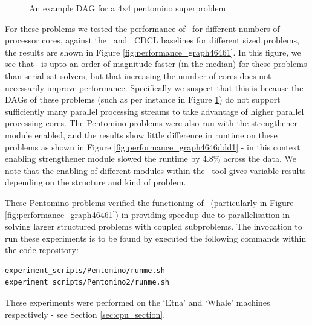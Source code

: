 \documentclass[
10pt, %
a4paper, %
oneside, %
headinclude,footinclude, %
BCOR5mm, %
]{scrartcl}
\begin{document}
\begin{figure}[h]
\caption{An example DAG for a 4x4 pentomino superproblem}\label{fig:dag_example1215}
\end{figure}

For these problems we tested the performance of \dagster\ for different numbers of processor cores, against the \tinisat\ and \lingeling\ CDCL baselines for different sized problems, the results are shown in Figure \ref{fig:performance_graph46461}.
In this figure, we see that \dagster\ is upto an order of magnitude faster (in the median) for these problems than serial sat solvers, but that increasing the number of cores does not necessarily improve performance.
Specifically we suspect that this is because the DAGs of these problems (such as per instance in Figure \ref{fig:dag_example1215}) do not support sufficiently many parallel processing streams to take advantage of higher parallel processing cores.
The Pentomino problems were also run with the strengthener module enabled, and the results show little difference in runtime on these problems as shown in Figure \ref{fig:performance_graph4646ddd1} - in this context enabling strengthener module slowed the runtime by 4.8\% across the data.
We note that the enabling of different modules within the \dagster\ tool gives variable results depending on the structure and kind of problem.




These Pentomino problems verified the functioning of \dagster\ (particularly in Figure \ref{fig:performance_graph46461}) in providing speedup due to parallelisation in solving larger structured problems with coupled subproblems. 
The invocation to run these experiments is to be found by executed the following commands within the code repository:
\begin{Verbatim}[frame=single]
experiment_scripts/Pentomino/runme.sh
experiment_scripts/Pentomino2/runme.sh
\end{Verbatim}
These experiments were performed on the `Etna' and `Whale' machines respectively - see Section \ref{sec:cpu_section}.
\end{document}
